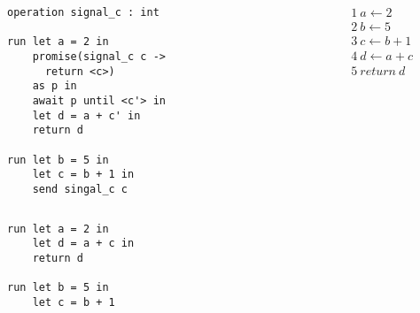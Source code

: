 \documentclass{beamer}
\theoremstyle{definition} %
\theoremstyle{plain} %
\begin{document}
	\begin{frame}[fragile]{\aeff{}}

		\begin{columns}[T]
			\begin{column}{0.49\textwidth}
				\begin{lstlisting}[basicstyle=\tiny]
operation signal_c : int		

run let a = 2 in
    promise(signal_c c -> 
      return <c>)
    as p in
    await p until <c'> in
    let d = a + c' in
    return d 

run let b = 5 in
    let c = b + 1 in
    send singal_c c
				\end{lstlisting}
			\end{column}
		
		
			\begin{column}{0.49\textwidth}
				\begin{align*}
				&1\ a \gets 2  \\
				&2\ b \gets 5 \\
				&3\ c \gets b + 1 \\
				&4\ d \gets a + c \\
				&5\ return\ d 
				\end{align*}
				\vspace{0.1ex}
			\end{column}
		\end{columns}
	
		
		\vspace{5ex}
		\begin{columns}[T]
			\begin{column}{0.49\textwidth}
				\begin{lstlisting}[basicstyle=\tiny]
run let a = 2 in
    let d = a + c in
    return d 

run let b = 5 in
    let c = b + 1
				\end{lstlisting}
			\end{column}
			
			
			\begin{column}{0.49\textwidth}
				\begin{lstlisting}[basicstyle=\tiny]

				\end{lstlisting}
			\end{column}
		\end{columns}


		
	\end{frame}
\end{document}
